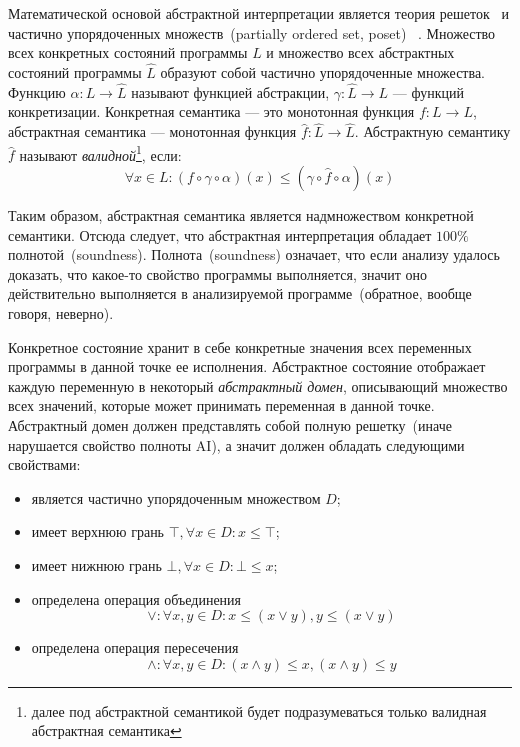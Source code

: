 Математической основой абстрактной интерпретации является теория решеток~\cite{
lattice} и частично упорядоченных множеств~(partially ordered set, poset)
~\cite{poset}. Множество всех конкретных состояний программы $L$ и множество
всех абстрактных состояний программы $\hat{L}$ образуют собой частично 
упорядоченные множества. Функцию $\alpha: L \rightarrow \hat{L}$ называют 
функцией абстракции, $\gamma: \hat{L} \rightarrow L$ --- функций конкретизации.
Конкретная семантика --- это монотонная функция $f: L \rightarrow L$, 
абстрактная семантика --- монотонная функция $\hat{f}: \hat{L} \rightarrow \hat
{L}$. Абстрактную семантику $\hat{f}$ называют \emph{валидной}\footnote{далее
под абстрактной семантикой будет подразумеваться только валидная абстрактная
семантика}, если:
\begin{equation*}
\forall x \in L: (f \circ \gamma \circ \alpha)(x) \le (\gamma \circ \hat{f} 
\circ \alpha)(x)
\end{equation*}

Таким образом, абстрактная семантика является надмножеством конкретной 
семантики. Отсюда следует, что абстрактная интерпретация обладает $100\%$ 
полнотой~(soundness). Полнота~(soundness) означает, что если анализу удалось 
доказать, что какое-то свойство программы выполняется, значит
оно действительно выполняется в анализируемой программе~(обратное, вообще
говоря, неверно).

Конкретное состояние хранит в себе конкретные значения всех переменных 
программы в данной точке ее исполнения. Абстрактное состояние отображает каждую
переменную в некоторый \emph{абстрактный домен}, описывающий множество всех
значений, которые может принимать переменная в данной точке. Абстрактный домен
должен представлять собой полную решетку~(иначе нарушается свойство полноты 
AI), а значит должен обладать следующими свойствами:
\begin{itemize}
\item является частично упорядоченным множеством $D$;
\item имеет верхнюю грань $\top, \forall x \in D: x \le \top$;
\item имеет нижнюю грань $\bot, \forall x \in D: \bot \le x$;
\item определена операция объединения
\begin{equation*}
\vee: \forall x, y \in D: x \le (x \vee y), y \le (x \vee y)
\end{equation*}
\item определена операция пересечения
\begin{equation*}
\wedge: \forall x, y \in D: (x \wedge y) \le x, (x \wedge y) \le y
\end{equation*}
\end{itemize}

